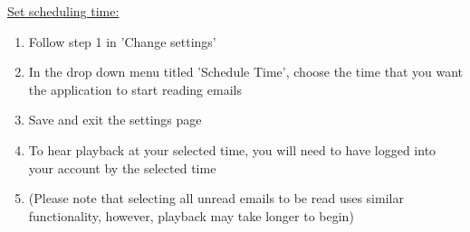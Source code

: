 \documentclass{article}
\begin{document}
\noindent \underline{Set scheduling time:}
\begin{enumerate}
  \item Follow step 1 in 'Change settings'
  \item In the drop down menu titled 'Schedule Time', choose the time that you want the application to start reading emails
  \item Save and exit the settings page
  \item To hear playback at your selected time, you will need to have logged into your account by the selected time
  \item (Please note that selecting all unread emails to be read uses similar functionality, however, playback may take longer to begin)
\end{enumerate}

\pagebreak
\end{document}

